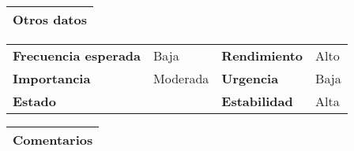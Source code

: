 \documentclass[11pt,a4paper]{article}
\begin{document}
\begin{table}[H]
	\begin{tabularx}{\textwidth}{X}
		\textbf{Otros datos}\\ \hline
	\end{tabularx}

	\begin{tabularx}{\textwidth}{lXlX}
		\textbf{Frecuencia esperada} & Baja & \textbf{Rendimiento} & Alto\\
		\textbf{Importancia} & Moderada & \textbf{Urgencia} & Baja\\
		\textbf{Estado} &  & \textbf{Estabilidad} & Alta\\
	\end{tabularx}
	
	\begin{tabularx}{\textwidth}{X}
		\textbf{Comentarios}\\ \hline
	\end{tabularx}
\end{table}

\newpage


\end{document}
